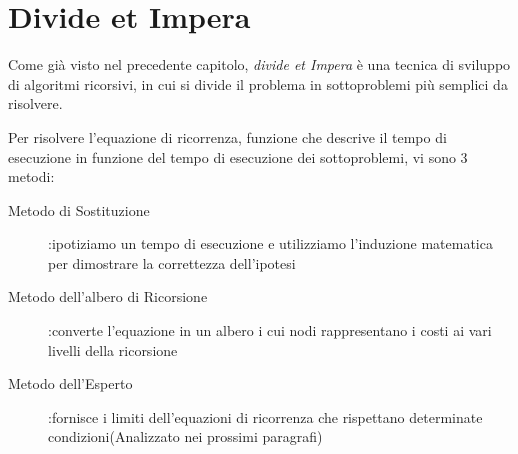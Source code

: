 \chapter{Divide et Impera}
Come già visto nel precedente capitolo, \emph{divide et Impera} è una tecnica
di sviluppo di algoritmi ricorsivi, in cui si divide il problema in sottoproblemi
più semplici da risolvere.

Per risolvere l'equazione di ricorrenza, funzione che descrive il tempo di esecuzione
in funzione del tempo di esecuzione dei sottoproblemi, vi sono 3 metodi:
\begin{description}
    \item[Metodo di Sostituzione]:ipotiziamo un tempo di esecuzione e utilizziamo
                l'induzione matematica per dimostrare la correttezza dell'ipotesi
    \item[Metodo dell'albero di Ricorsione]:converte l'equazione in un albero i cui
          nodi rappresentano i costi ai vari livelli della ricorsione
    \item[Metodo dell'Esperto]:fornisce i limiti dell'equazioni di ricorrenza che
          rispettano determinate condizioni(Analizzato nei prossimi paragrafi)
\end{description}



